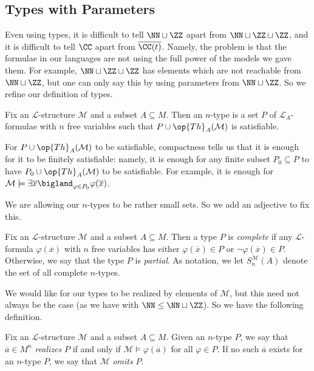 \documentclass[../notes.tex]{subfiles}
\begin{document}
\subsection{Types with Parameters}
Even using types, it is difficult to tell $\NN\sqcup\ZZ$ apart from $\NN\sqcup\ZZ\sqcup\ZZ$, and it is difficult to tell $\CC$ apart from $\overline{\CC(t)}$. Namely, the problem is that the formulae in our languages are not using the full power of the models we gave them. For example, $\NN\sqcup\ZZ\sqcup\ZZ$ has elements which are not reachable from $\NN\sqcup\ZZ$, but one can only say this by using parameters from $\NN\sqcup\ZZ$. So we refine our definition of types.
\begin{definition}[type]
	Fix an $\mathcal L$-structure $\mathcal M$ and a subset $A\subseteq M$. Then an $n$-type is a set $P$ of $\mathcal L_A$-formulae with $n$ free variables such that $P\cup\op{Th}_A(\mathcal M)$ is satisfiable.
\end{definition}
\begin{remark}
	For $P\cup\op{Th}_A(\mathcal M)$ to be satisfiable, compactness tells us that it is enough for it to be finitely satisfiable: namely, it is enough for any finite subset $P_0\subseteq P$ to have $P_0\cup\op{Th}_A(\mathcal M)$ to be satisfiable. For example, it is enough for $\mathcal M\models\exists\overline x\bigland_{\varphi\in P_0}\varphi(\overline x)$.
\end{remark}
We are allowing our $n$-types to be rather small sets. So we add an adjective to fix this.
\begin{definition}[complete]
	Fix an $\mathcal L$-structure $\mathcal M$ and a subset $A\subseteq M$. Then a type $P$ is \textit{complete} if any $\mathcal L$-formula $\varphi(\overline x)$ with $n$ free variables has either $\varphi(\overline x)\in P$ or $\lnot\varphi(\overline x)\in P$. Otherwise, we say that the type $P$ is \textit{partial}. As notation, we let $S_n^{\mathcal M}(A)$ denote the set of all complete $n$-types.
\end{definition}
We would like for our types to be realized by elements of $\mathcal M$, but this need not always be the case (as we have with $\NN\le\NN\sqcup\ZZ$). So we have the following definition.
\begin{definition}[realizes]
	Fix an $\mathcal L$-structure $\mathcal M$ and a subset $A\subseteq M$. Given an $n$-type $P$, we say that $\overline a\in M^n$ \textit{realizes} $P$ if and only if $\mathcal M\models\varphi(\overline a)$ for all $\varphi\in P$. If no such $\overline a$ exists for an $n$-type $P$, we say that $\mathcal M$ \textit{omits} $P$.
\end{definition}
\end{document}

